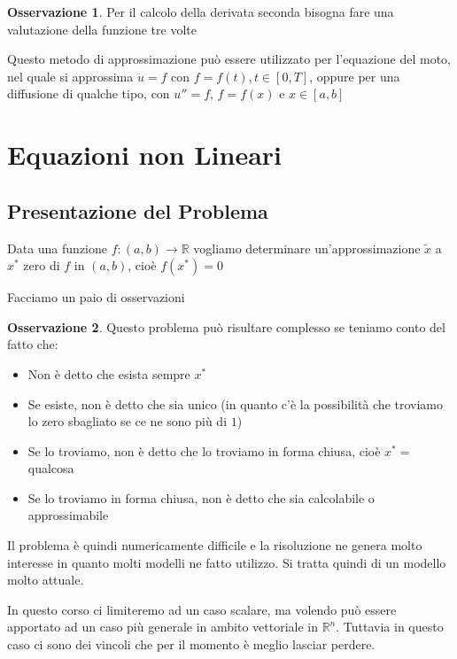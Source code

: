 \documentclass[11pt,a4paper,twoside]{article}
\theoremstyle{definition}
\newtheorem*{oss}{Osservazione}
\begin{document}
\begin{oss}
	Per il calcolo della derivata seconda bisogna fare una valutazione della funzione tre volte
\end{oss}

Questo metodo di approssimazione può essere utilizzato per l'equazione del moto, nel quale si approssima $\ddot u = f$ con $f = f(t), t \in [0,T]$, oppure per una diffusione di qualche tipo, con $u'' = f$, $f = f(x)$ e $x \in [a,b]$

\newpage

\section{Equazioni non Lineari}

\subsection{Presentazione del Problema}

Data una funzione $f:(a,b) \to \mathbb R$ vogliamo determinare un'approssimazione $\tilde x$ a $x^*$ zero di $f$ in $(a,b)$, cioè $f(x^*)=0$

Facciamo un paio di osservazioni

\begin{oss}
	Questo problema può risultare complesso se teniamo conto del fatto che:
	\begin{itemize}
		\item Non è detto che esista sempre $x^*$
		\item Se esiste, non è detto che sia unico (in quanto c'è la possibilità che troviamo lo zero sbagliato se ce ne sono più di $1$)
		\item Se lo troviamo, non è detto che lo troviamo in forma chiusa, cioè $x^*=$qualcosa
		\item Se lo troviamo in forma chiusa, non è detto che sia calcolabile o approssimabile
	\end{itemize}
\end{oss}

Il problema è quindi numericamente difficile e la risoluzione ne genera molto interesse in quanto molti modelli ne fatto utilizzo. Si tratta quindi di un modello molto attuale.

In questo corso ci limiteremo ad un caso scalare, ma volendo può essere apportato ad un caso più generale in ambito vettoriale in $\mathbb R^n$. Tuttavia in questo caso ci sono dei vincoli che per il momento è meglio lasciar perdere.
\end{document}
